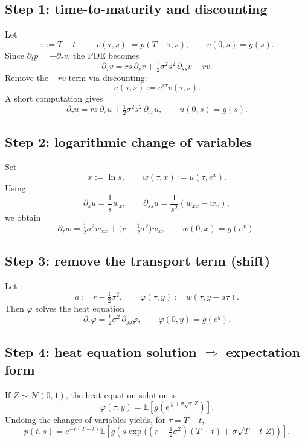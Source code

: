 \documentclass[11pt]{article}
\theoremstyle{definition}
\theoremstyle{remark}
\newcommand{\E}{\mathbb{E}}
\newcommand{\1}{\mathbf{1}}
\theoremstyle{definition}
\begin{document}
\subsection*{Step 1: time-to-maturity and discounting}
Let
\[
\tau:=T-t,
\qquad v(\tau,s):=p(T-\tau,s),
\qquad v(0,s)=g(s).
\]
Since $\partial_t p = -\partial_\tau v$, the PDE becomes
\[
\partial_\tau v
=
rs\,\partial_s v + \tfrac12\sigma^2 s^2\,\partial_{ss}v - r v.
\]
Remove the $-rv$ term via discounting:
\[
u(\tau,s):=e^{r\tau}v(\tau,s).
\]
A short computation gives
\[
\partial_\tau u
=
rs\,\partial_s u + \tfrac12\sigma^2 s^2\,\partial_{ss}u,
\qquad u(0,s)=g(s).
\]

\subsection*{Step 2: logarithmic change of variables}
Set
\[
x:=\ln s,\qquad w(\tau,x):=u(\tau,e^x).
\]
Using
\[
\partial_s u=\frac{1}{s}w_x,\qquad
\partial_{ss}u=\frac{1}{s^2}(w_{xx}-w_x),
\]
we obtain
\[
\partial_\tau w
=
\tfrac12\sigma^2 w_{xx} + \Big(r-\tfrac12\sigma^2\Big)w_x,
\qquad w(0,x)=g(e^x).
\]

\subsection*{Step 3: remove the transport term (shift)}
Let
\[
a:=r-\tfrac12\sigma^2,
\qquad
\varphi(\tau,y):=w(\tau,y-a\tau).
\]
Then $\varphi$ solves the heat equation
\[
\partial_\tau \varphi
=
\tfrac12\sigma^2\,\partial_{yy}\varphi,
\qquad
\varphi(0,y)=g(e^y).
\]

\subsection*{Step 4: heat equation solution $\Rightarrow$ expectation form}
If $Z\sim\mathcal N(0,1)$, the heat equation solution is
\[
\varphi(\tau,y)
=
\E\!\left[g\!\left(e^{\,y+\sigma\sqrt{\tau}\,Z}\right)\right].
\]
Undoing the changes of variables yields, for $\tau=T-t$,
\[
\boxed{
\;
p(t,s)
=
e^{-r(T-t)}
\E\!\left[
g\!\left(
s\exp\!\Big((r-\tfrac12\sigma^2)(T-t)+\sigma\sqrt{T-t}\,Z\Big)
\right)
\right].
\;}
\]
\end{document}
